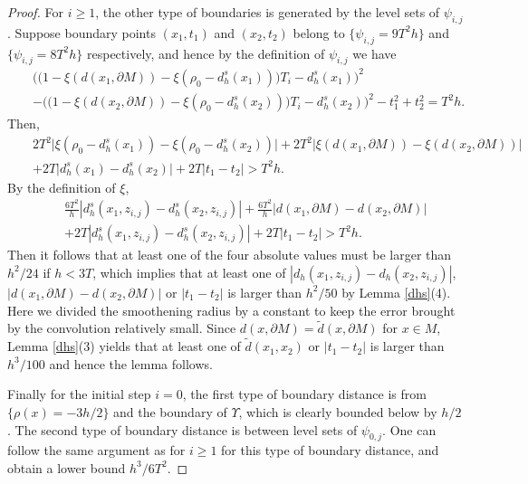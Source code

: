 \documentclass[11pt,letterpaper]{amsart}
\numberwithin{equation}{section}
\theoremstyle{definition}
\theoremstyle{plain}
\theoremstyle{definition}
\theoremstyle{plain}
\theoremstyle{definition}
\theoremstyle{plain}
\begin{document}
\begin{proof}
For $i\geqslant 1$, the other type of boundaries is generated by the level sets of $\psi_{i,j}$. Suppose boundary points $(x_1,t_1)$ and $(x_2,t_2)$ belong to $\{\psi_{i,j} =9T^2h\}$ and $\{\psi_{i,j} = 8T^2h\}$ respectively, and hence by the definition of $\psi_{i,j}$ we have
\begin{eqnarray*}
&&\Big(\big(1-\xi(d(x_1,\partial M))-\xi(\rho_0-d_h^s(x_1))\big)T_i-d_h^s(x_1)\Big)^2\\
&&-\Big(\big(1-\xi(d(x_2,\partial M))-\xi(\rho_0-d_h^s(x_2))\big)T_i-d_h^s(x_2)\Big)^2-t_1^2+t_2^2 = T^2 h.
\end{eqnarray*}
Then,
\begin{eqnarray*}
&&2T^2 \big|\xi(\rho_0-d_h^s(x_1))-\xi(\rho_0-d_h^s(x_2)) \big|+2T^2 \big|\xi(d(x_1,\partial M)) -\xi(d(x_2,\partial M)) \big| \\
&&+2T\big|d_h^s(x_1)-d_h^s(x_2) \big|+2T|t_1-t_2| >T^2 h.
\end{eqnarray*}
By the definition of $\xi$,
\begin{eqnarray*}
&&\frac{6T^2}{h}|d_h^s(x_1,z_{i,j})-d_h^s(x_2,z_{i,j})|+\frac{6T^2}{h}| d(x_1,\partial M)-d(x_2,\partial M)| \\
&&+2T|d_h^s(x_1,z_{i,j})-d_h^s(x_2,z_{i,j})|+2T|t_1-t_2| > T^2 h.
\end{eqnarray*}
Then it follows that at least one of the four absolute values must be larger than $h^2/24$ if $h<3T$, which implies that at least one of $|d_h(x_1,z_{i,j})-d_h(x_2,z_{i,j})|$, $|d(x_1,\partial M)-d(x_2,\partial M)|$ or $|t_1-t_2|$ is larger than $h^2/50$ by Lemma \ref{dhs}(4). Here we divided the smoothening radius by a constant to keep the error brought by the convolution relatively small. Since $d(x,\partial M)=\widetilde{d}(x,\partial M)$ for $x\in M$, Lemma \ref{dhs}(3) yields that at least one of $\widetilde{d}(x_1,x_2)$ or $|t_1-t_2|$ is larger than $h^3/100$ and hence the lemma follows.

Finally for the initial step $i=0$, the first type of boundary distance is from $\{\rho(x)=-3h/2\}$ and the boundary of $\Upsilon$, which is clearly bounded below by $h/2$. The second type of boundary distance is between level sets of $\psi_{0,j}$. One can follow the same argument as for $i\geqslant 1$ for this type of boundary distance, and obtain a lower bound $h^3/6T^2$.
\end{proof}
\end{document}

